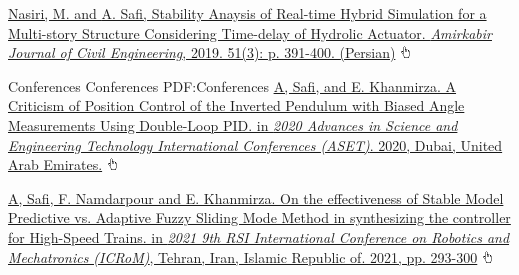 \documentclass[letterpaper,MMMyyyy]{ResumeTemplate}
\begin{document}
\begin{Body}
\Gap\vspace{5pt}
\NumberedItem{[3]}
\href{https://ceej.aut.ac.ir/article_2911.html?lang=en}
{Nasiri, M. and \underline{A. Safi}, Stability Anaysis of Real-time Hybrid Simulation for a Multi-story Structure Considering Time-delay of Hydrolic Actuator. \textit{Amirkabir Journal of Civil Engineering}, 2019. 51(3): p. 391-400. (Persian)} \includegraphics[height=9pt]{icons/hand-cursor.png}

\Gap
\endgroup

\BigGap
\SubSection
{Conferences}
{Conferences}
{PDF:Conferences}
\begingroup
\renewcommand{\MaxNumberedItem}{[88]}
\BigGap
\NumberedItem{[4]}
\href{https://ieeexplore.ieee.org/document/9118277}
{\underline{A, Safi}, and E. Khanmirza. A Criticism of Position Control of the Inverted Pendulum with Biased Angle Measurements Using Double-Loop PID. in \textit{2020 Advances in Science and Engineering Technology International Conferences (ASET)}. 2020, Dubai, United Arab Emirates.}
\includegraphics[height=9pt]{icons/hand-cursor.png}

\Gap\vspace{5pt}
\NumberedItem{[5]}
\href{https://ieeexplore.ieee.org/document/9663459}
{\underline{A, Safi}, F. Namdarpour and E. Khanmirza. On the effectiveness of Stable Model Predictive vs. Adaptive Fuzzy Sliding Mode Method in synthesizing the controller for High-Speed Trains. in \textit{2021 9th RSI International Conference on Robotics and Mechatronics (ICRoM)}, Tehran, Iran, Islamic Republic of. 2021, pp. 293-300}
\includegraphics[height=9pt]{icons/hand-cursor.png}

\Gap
\endgroup





\end{Body}
\end{document}
